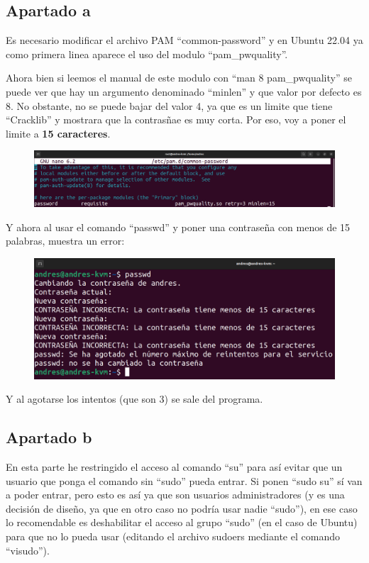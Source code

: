 \documentclass{article}
\begin{document}
\subsection{Apartado a}
Es necesario modificar el archivo PAM ``common-password'' y en Ubuntu 22.04 ya como primera linea aparece el uso del modulo ``pam\_pwquality''. 

Ahora bien si leemos el manual de este modulo con ``man 8 pam\_pwquality'' se puede ver que hay un argumento denominado ``minlen'' y que valor por defecto es 8. No obstante, no se puede bajar del valor 4, ya que es un limite que tiene ``Cracklib'' y mostrara que la contrasñae es muy corta. Por eso, voy a poner el limite a \textbf{15 caracteres}.

\begin{figure}[H]
    \includegraphics[width=\textwidth]{imagenes/passwordminlen15.png}
\end{figure}

Y ahora al usar el comando ``passwd'' y poner una contraseña con menos de 15 palabras, muestra un error:

\begin{figure}[H]
    \includegraphics[width=\textwidth]{imagenes/passwordminlen15passwd.png}
\end{figure}

Y al agotarse los intentos (que son 3) se sale del programa.
\subsection{Apartado b}
En esta parte he restringido el acceso al comando ``su'' para así evitar que un usuario que ponga el comando sin ``sudo'' pueda entrar. Si ponen ``sudo su'' sí van a poder entrar, pero esto es así ya que son usuarios administradores (y es una decisión de diseño, ya que en otro caso no podría usar nadie ``sudo''), en ese caso lo recomendable es deshabilitar el acceso al grupo ``sudo'' (en el caso de Ubuntu) para que no lo pueda usar (editando el archivo sudoers mediante el comando ``visudo'').
\end{document}
